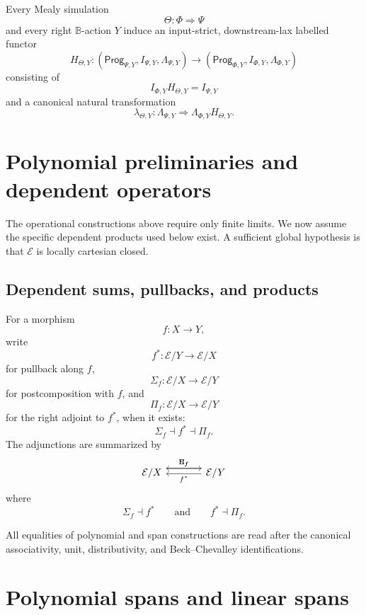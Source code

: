 \begin{corollary}
\label{cor:relative-labelled-functor-simulation}
Every Mealy simulation
\[
\Theta:\Phi\Rightarrow\Psi
\]
and every right \(\mathbb B\)-action \(Y\) induce an input-strict,
downstream-lax labelled functor
\[
H_{\Theta,Y}:
(\mathsf{Prog}_{\Psi,Y},I_{\Psi,Y},\Lambda_{\Psi,Y})
\longrightarrow
(\mathsf{Prog}_{\Phi,Y},I_{\Phi,Y},\Lambda_{\Phi,Y})
\]
consisting of
\[
I_{\Phi,Y}H_{\Theta,Y}=I_{\Psi,Y}
\]
and a canonical natural transformation
\[
\lambda_{\Theta,Y}:
\Lambda_{\Psi,Y}
\Rightarrow
\Lambda_{\Phi,Y}H_{\Theta,Y}.
\]
\end{corollary}


\section{Polynomial preliminaries and dependent operators}
\label{sec:relative-polynomial-preliminaries}

The operational constructions above require only finite limits.  We now
assume the specific dependent products used below exist.  A sufficient global
hypothesis is that \(\mathcal E\) is locally cartesian closed.

\subsection{Dependent sums, pullbacks, and products}
\label{subsec:poly-relative-dependent-operators}

For a morphism
\[
f:X\to Y,
\]
write
\[
f^\ast:\mathcal E/Y\to\mathcal E/X
\]
for pullback along \(f\),
\[
\Sigma_f:\mathcal E/X\to\mathcal E/Y
\]
for postcomposition with \(f\), and
\[
\Pi_f:\mathcal E/X\to\mathcal E/Y
\]
for the right adjoint to \(f^\ast\), when it exists:
\[
\Sigma_f\dashv f^\ast\dashv\Pi_f.
\]
The adjunctions are summarized by
\[
\begin{tikzcd}[column sep=large]
\mathcal E/X
  \arrow[r,shift left=1.1ex,"\Sigma_f"]
&
\mathcal E/Y
  \arrow[l,shift left=.2ex,"f^\ast"]
  \arrow[l,shift right=1.1ex,"\Pi_f"']
\end{tikzcd}
\]
where
\[
\Sigma_f\dashv f^\ast
\qquad\text{and}\qquad
f^\ast\dashv\Pi_f.
\]

All equalities of polynomial and span constructions are read after the
canonical associativity, unit, distributivity, and Beck--Chevalley
identifications.

\section{Polynomial spans and linear spans}
\label{sec:poly-relative-polynomial-spans}

